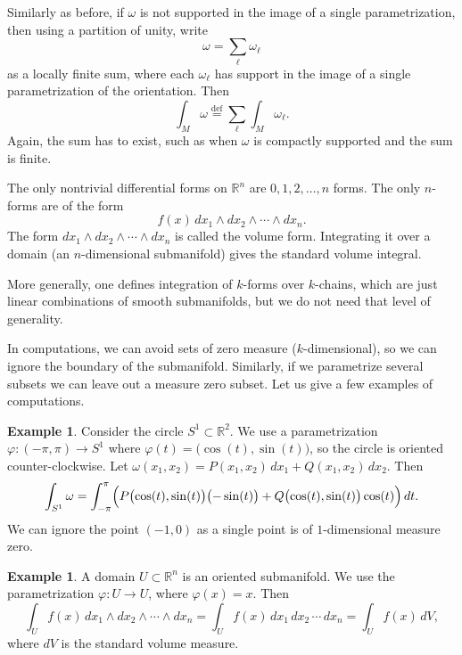 \documentclass[12pt,openany]{book}
\newcommand{\R}{{\mathbb{R}}}
\theoremstyle{plain}
\theoremstyle{remark}
\theoremstyle{definition}
\theoremstyle{exercise}
\theoremstyle{example}
\newtheorem{example}[thm]{Example}
\begin{document}
Similarly as before, if $\omega$ is not supported in the
image of a single parametrization, then using a partition of unity,
write
\begin{equation*}
\omega = \sum_{\ell} \omega_\ell
\end{equation*}
as a locally finite sum,
where each $\omega_\ell$ has support in the image of a single
parametrization of the orientation.
Then
\begin{equation*}
\int_M \omega
\overset{\text{def}}{=}
\sum_{\ell}
\int_M \omega_\ell .
\end{equation*}
Again, the sum has to exist, such as when $\omega$ is compactly supported
and the sum is finite.

The only nontrivial differential forms on $\R^n$
are $0,1,2,\ldots,n$ forms.  The only $n$-forms are
of the form
\begin{equation*}
f(x) \,
dx_1 \wedge dx_2 \wedge \cdots \wedge dx_n .
\end{equation*}
The form $dx_1 \wedge dx_2 \wedge \cdots \wedge dx_n$ is called the
volume form.  Integrating it over a domain (an $n$-dimensional submanifold)
gives the standard volume integral.

More generally, one defines integration of $k$-forms over $k$-chains,
which are just linear combinations of smooth submanifolds, but we do not
need that level of generality.

\medskip

In computations, we can avoid sets of zero measure ($k$-dimensional),
so we can ignore the boundary of the submanifold.  Similarly, if we parametrize
several subsets we can leave out a measure zero subset.
Let us give a few examples of computations.

\begin{example} \label{example:diffformscircleint}
Consider the circle $S^1 \subset
\R^2$.  We use a parametrization $\varphi \colon (-\pi,\pi) \to S^1$
where $\varphi(t) = \bigl(\cos(t),\sin(t)\bigr)$, so the circle is oriented
counter-clockwise.
Let $\omega(x_1,x_2) = P(x_1,x_2) \, dx_1 + Q(x_1,x_2) \, dx_2$.
Then
\begin{equation*}
\int_{S^1} \omega =
\int_{-\pi}^{\pi}
\Bigl(
P\bigl(\cos(t),\sin(t)\bigr) \bigl(-\sin(t)\bigr)  +
Q\bigl(\cos(t),\sin(t)\bigr) \cos(t) \Bigr) \, dt .
\end{equation*}
We can ignore the point $(-1,0)$ as a single point is of $1$-dimensional
measure zero.
\end{example}

\begin{example}
A domain $U \subset \R^n$ is an oriented submanifold.
We use the parametrization $\varphi \colon U \to U$, where $\varphi(x) =
x$.  Then
\begin{equation*}
\int_U f(x) \, dx_1 \wedge dx_2 \wedge \cdots \wedge dx_n
=
\int_U f(x) \, dx_1 \, dx_2 \,  \cdots \, dx_n
=
\int_U f(x) \, dV ,
\end{equation*}
where $dV$ is the standard volume measure.
\end{example}
\end{document}

